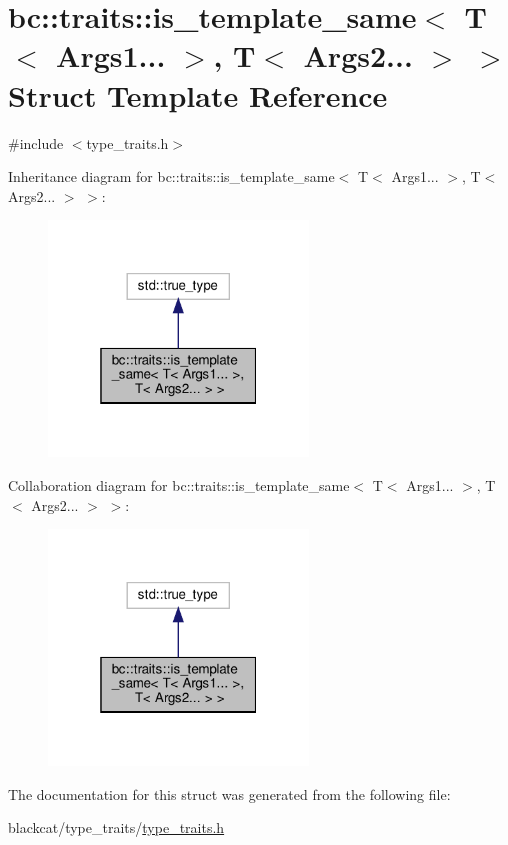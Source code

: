 \hypertarget{structbc_1_1traits_1_1is__template__same_3_01T_3_01Args1_8_8_8_01_4_00_01T_3_01Args2_8_8_8_01_4_01_4}{}\section{bc\+:\+:traits\+:\+:is\+\_\+template\+\_\+same$<$ T$<$ Args1... $>$, T$<$ Args2... $>$ $>$ Struct Template Reference}
\label{structbc_1_1traits_1_1is__template__same_3_01T_3_01Args1_8_8_8_01_4_00_01T_3_01Args2_8_8_8_01_4_01_4}


{\ttfamily \#include $<$type\+\_\+traits.\+h$>$}



Inheritance diagram for bc\+:\+:traits\+:\+:is\+\_\+template\+\_\+same$<$ T$<$ Args1... $>$, T$<$ Args2... $>$ $>$\+:\nopagebreak
\begin{figure}[H]
\begin{center}
\leavevmode
\includegraphics[width=196pt]{structbc_1_1traits_1_1is__template__same_3_01T_3_01Args1_8_8_8_01_4_00_01T_3_01Args2_8_8_8_01_4_01_4__inherit__graph}
\end{center}
\end{figure}


Collaboration diagram for bc\+:\+:traits\+:\+:is\+\_\+template\+\_\+same$<$ T$<$ Args1... $>$, T$<$ Args2... $>$ $>$\+:\nopagebreak
\begin{figure}[H]
\begin{center}
\leavevmode
\includegraphics[width=196pt]{structbc_1_1traits_1_1is__template__same_3_01T_3_01Args1_8_8_8_01_4_00_01T_3_01Args2_8_8_8_01_4_01_4__coll__graph}
\end{center}
\end{figure}


The documentation for this struct was generated from the following file\+:\begin{DoxyCompactItemize}
\item 
blackcat/type\+\_\+traits/\hyperlink{type__traits_2type__traits_8h}{type\+\_\+traits.\+h}\end{DoxyCompactItemize}
